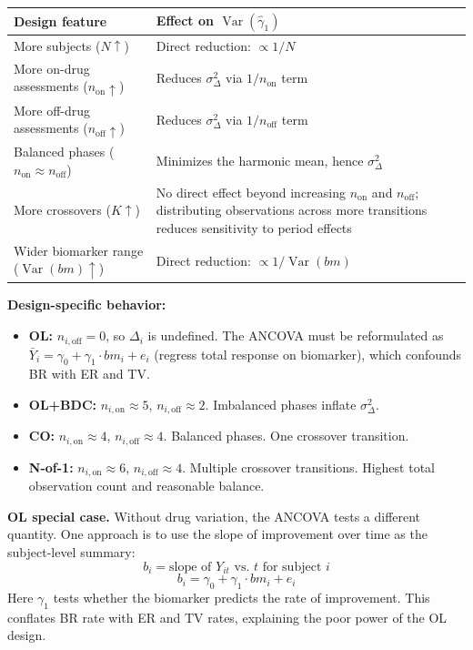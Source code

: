 \documentclass[11pt]{article}
\begin{document}
\begin{table}[h]
\centering\small
\begin{tabular}{@{}L{4.5cm}L{9cm}@{}}
\toprule
Design feature & Effect on $\operatorname{Var}(\hat{\gamma}_1)$ \\
\midrule
More subjects ($N \uparrow$) & Direct reduction: $\propto 1/N$ \\
More on-drug assessments ($n_{\text{on}} \uparrow$) & Reduces $\sigma^2_\Delta$ via $1/n_{\text{on}}$ term \\
More off-drug assessments ($n_{\text{off}} \uparrow$) & Reduces $\sigma^2_\Delta$ via $1/n_{\text{off}}$ term \\
Balanced phases ($n_{\text{on}} \approx n_{\text{off}}$) & Minimizes the harmonic mean, hence $\sigma^2_\Delta$ \\
More crossovers ($K \uparrow$) & No direct effect beyond increasing $n_{\text{on}}$ and $n_{\text{off}}$; distributing observations across more transitions reduces sensitivity to period effects \\
Wider biomarker range ($\operatorname{Var}(bm) \uparrow$) & Direct reduction: $\propto 1/\operatorname{Var}(bm)$ \\
\bottomrule
\end{tabular}
\end{table}

\textbf{Design-specific behavior:}
\begin{itemize}[nosep]
\item \textbf{OL:} $n_{i,\text{off}} = 0$, so $\Delta_i$ is undefined.
  The ANCOVA must be reformulated as
  $\bar{Y}_i = \gamma_0 + \gamma_1 \cdot bm_i + e_i$ (regress total
  response on biomarker), which confounds BR with ER and TV.
\item \textbf{OL+BDC:} $n_{i,\text{on}} \approx 5$,
  $n_{i,\text{off}} \approx 2$. Imbalanced phases inflate
  $\sigma^2_\Delta$.
\item \textbf{CO:} $n_{i,\text{on}} \approx 4$,
  $n_{i,\text{off}} \approx 4$. Balanced phases. One crossover
  transition.
\item \textbf{N-of-1:} $n_{i,\text{on}} \approx 6$,
  $n_{i,\text{off}} \approx 4$. Multiple crossover transitions. Highest
  total observation count and reasonable balance.
\end{itemize}

\textbf{OL special case.} Without drug variation, the ANCOVA tests a
different quantity. One approach is to use the slope of improvement over
time as the subject-level summary:
\[
b_i = \text{slope of } Y_{it} \text{ vs.\ } t \text{ for subject } i
\]
\[
b_i = \gamma_0 + \gamma_1 \cdot bm_i + e_i
\]
Here $\gamma_1$ tests whether the biomarker predicts the rate of
improvement. This conflates BR rate with ER and TV rates, explaining the
poor power of the OL design.
\end{document}
